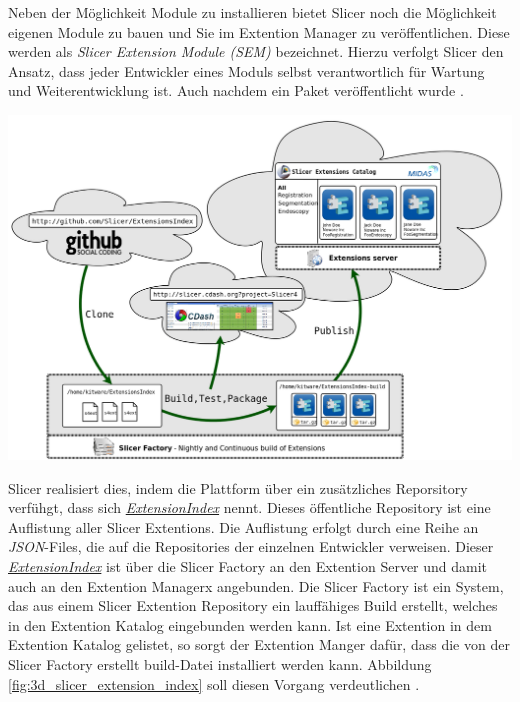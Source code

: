 \begin{minipage}{0.30\textwidth}
	Neben der Möglichkeit Module zu installieren bietet Slicer noch die Möglichkeit
	eigenen Module zu bauen und Sie im Extention Manager zu veröffentlichen. Diese
	werden als \textit{Slicer Extension Module (SEM)} bezeichnet. Hierzu verfolgt
	Slicer den Ansatz, dass jeder Entwickler eines Moduls selbst verantwortlich für
	Wartung und Weiterentwicklung ist. Auch nachdem ein Paket veröffentlicht wurde
	\citep{slicer2024}.
\end{minipage}
\hfill
\begin{minipage}{0.60\textwidth}
	\centering
	\includegraphics[width=1\textwidth]{img/slicer_extention_index.png}
	\label{fig:3d_slicer_extension_index}
\end{minipage}

Slicer realisiert dies, indem die Plattform über ein zusätzliches Reporsitory verfühgt,
dass sich
\href{https://github.com/Slicer/ExtensionsIndex?tab=readme-ov-file}{\textit{ExtensionIndex}}
nennt. Dieses öffentliche Repository ist eine Auflistung aller Slicer Extentions.
Die Auflistung erfolgt durch eine Reihe an \textit{JSON}-Files, die auf die
Repositories der einzelnen Entwickler verweisen. Dieser \href{https://github.com/Slicer/ExtensionsIndex?tab=readme-ov-file}{\textit{ExtensionIndex}}
ist über die Slicer Factory an den Extention Server und damit auch an den Extention
Managerx angebunden. Die Slicer Factory ist ein System, das aus einem Slicer Extention
Repository ein lauffähiges Build erstellt, welches in den Extention Katalog
eingebunden werden kann. Ist eine Extention in dem Extention Katalog gelistet,
so sorgt der Extention Manger dafür, dass die von der Slicer Factory erstellt build-Datei
installiert werden kann. Abbildung \ref{fig:3d_slicer_extension_index} soll
diesen Vorgang verdeutlichen \citep[vgl.][]{slicer2024}.

